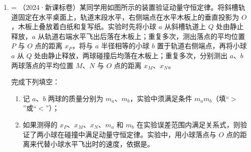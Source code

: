 \documentclass[\gkver]{gaokaozhenti}
\makeatletter
\newcommand{\tiinfo}[2]{{\small\color{gray}（#1）\textcolor{orange!85!black}{\nandu{#2}}}\hspace{0.4em}}
\newenvironment{tibody}
  {\begin{minipage}[t]{\linewidth}\@listdepth=\@ne\leavevmode\ignorespaces}
  {\end{minipage}}
\makeatother
\begin{document}
\begin{enumerate}[resume=tiku]
\item
\begin{tibody}
\tiinfo{2024·新课标卷}{2}某同学用如图所示的装置验证动量守恒定律。将斜槽轨道固定在水平桌面上，轨道末段水平，右侧端点在水平木板上的垂直投影为 $O$，木板上叠放着白纸和复写纸。实验时先将小球 $a$ 从斜槽轨道上 $Q$ 处由静止释放，$a$ 从轨道右端水平飞出后落在木板上；重复多次，测出落点的平均位置 $P$ 与 $O$ 点的距离 $x_{P}$，将与 $a$ 半径相等的小球 $b$ 置于轨道右侧端点，再将小球 $a$ 从 $Q$ 处由静止释放，两球碰撞后均落在木板上；重复多次，分别测出 $a$、$b$ 两球落点的平均位置 $M$、$N$ 与 $O$ 点的距离 $x_{M}$、$x_{N}$。

完成下列填空：
\begin{enumerate}
	\item
	记 $a$、$b$ 两球的质量分别为 $m_{a}$、$m_{b}$，实验中须满足条件 $m_{a}$\tkanswer{>}$m_{b}$（填“$>$”或“$<$”）；
	\item
	如果测得的 $x_{P}$、$x_{M}$、$x_{N}$、$m_{a}$ 和 $m_{b}$ 在实验误差范围内满足关系式\newline{}，则验证了两小球在碰撞中满足动量守恒定律。实验中，用小球落点与 $O$ 点的距离来代替小球水平飞出时的速度，依据是。
\end{enumerate}
\end{tibody}

\end{enumerate}
\end{document}
